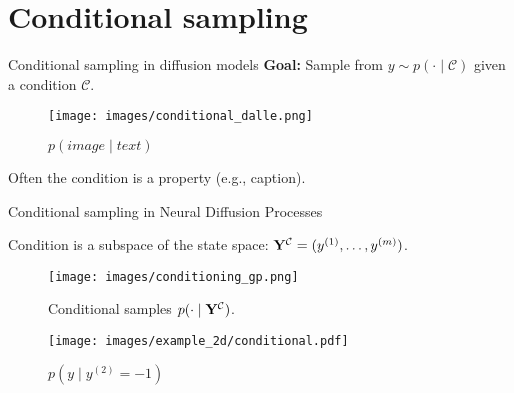 

\section{Conditional sampling}

\begin{frame}{Conditional sampling in diffusion models}
    \textbf{Goal:} Sample from $y \sim p(\cdot \mid \mathcal{C})$ given a condition $\mathcal{C}$.\\
    \pause
    \begin{figure}
    \centering
    \texttt{[image: images/conditional\_dalle.png]}
    \caption{$p(image \mid text)$}
    \end{figure}
    Often the condition is a property (e.g., caption).
    \end{frame}
    
    \begin{frame}{Conditional sampling in Neural Diffusion Processes}
    
    Condition is a subspace of the state space: $\mathbf{Y}^\mathcal{C} = (y^{(1)}, \ldots, y^{(m)})$.
    \begin{figure}
    \centering
    \texttt{[image: images/conditioning\_gp.png]}
    \caption{Conditional samples $p(\cdot \mid \mathbf{Y}^\mathcal{C})$.}
    \end{figure}
\pause
\vspace{-5mm}
\begin{figure}
\centering
\texttt{[image: images/example\_2d/conditional.pdf]}
\caption{$p(y \mid y^{(2)} = -1)$}
\end{figure}
\end{frame}


